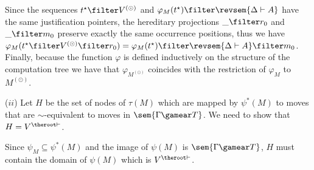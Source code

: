 Since the sequences $t^\star \filter V^{(\odot)}$ and  $\varphi_M(t^\star) \filter \revsem{\Delta \vdash A }$ have the same justification pointers,
the hereditary projections $\_ \filter r_0$ and $\_ \filter  m_0$ preserve exactly the same occurrence positions, thus we have
$\varphi_{M}(t^\star \filter V^{(\odot)} \filter r_0) = \varphi_M(t^\star) \filter \revsem{\Delta \vdash A} \filter m_0$.
Finally, because the function $\varphi$ is defined inductively on the structure of the computation tree we have that $\varphi_{M^{(\odot)}}$ coincides with the restriction of $\varphi_{M}$ to $M^{(\odot)}$.


($ii$) Let $H$ be the set of nodes of $\tau(M)$ which are mapped by
$\psi^*(M)$ to moves that are $\sim$-equivalent to moves in
$\sem{\Gamma \gamear T}$. We need to show that $H = V^{\theroot\vdash}$.

Since $\psi_M \subseteq \psi^*(M)$ and the image of $\psi(M)$ is
$\sem{\Gamma \gamear T}$, $H$ must contain the domain of
$\psi(M)$ which is $V^{\theroot\vdash}$.


